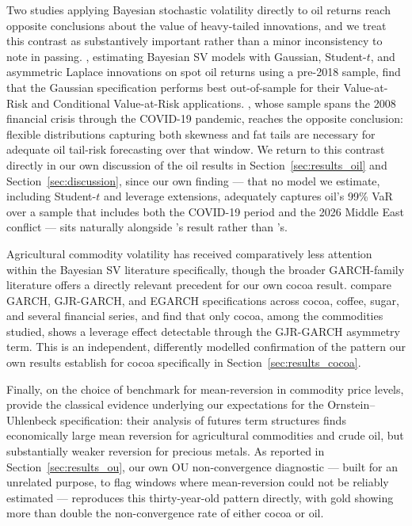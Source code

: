 \documentclass[preprint,12pt,authoryear]{elsarticle}
\begin{document}
Two studies applying Bayesian stochastic volatility directly to oil returns reach opposite conclusions about the value of heavy-tailed innovations, and we treat this contrast as substantively important rather than a minor inconsistency to note in passing. \citet{chenzerillibaum2019}, estimating Bayesian SV models with Gaussian, Student-$t$, and asymmetric Laplace innovations on spot oil returns using a pre-2018 sample, find that the Gaussian specification performs best out-of-sample for their Value-at-Risk and Conditional Value-at-Risk applications. \citet{kuang2022}, whose sample spans the 2008 financial crisis through the COVID-19 pandemic, reaches the opposite conclusion: flexible distributions capturing both skewness and fat tails are necessary for adequate oil tail-risk forecasting over that window. We return to this contrast directly in our own discussion of the oil results in Section~\ref{sec:results_oil} and Section~\ref{sec:discussion}, since our own finding --- that no model we estimate, including Student-$t$ and leverage extensions, adequately captures oil's 99\% VaR over a sample that includes both the COVID-19 period and the 2026 Middle East conflict --- sits naturally alongside \citet{kuang2022}'s result rather than \citet{chenzerillibaum2019}'s.

Agricultural commodity volatility has received comparatively less attention within the Bayesian SV literature specifically, though the broader GARCH-family literature offers a directly relevant precedent for our own cocoa result. \citet{roux2018} compare GARCH, GJR-GARCH, and EGARCH specifications across cocoa, coffee, sugar, and several financial series, and find that only cocoa, among the commodities studied, shows a leverage effect detectable through the GJR-GARCH asymmetry term. This is an independent, differently modelled confirmation of the pattern our own results establish for cocoa specifically in Section~\ref{sec:results_cocoa}.

Finally, on the choice of benchmark for mean-reversion in commodity price levels, \citet{bessembinderetal1995} provide the classical evidence underlying our expectations for the Ornstein--Uhlenbeck specification: their analysis of futures term structures finds economically large mean reversion for agricultural commodities and crude oil, but substantially weaker reversion for precious metals. As reported in Section~\ref{sec:results_ou}, our own OU non-convergence diagnostic --- built for an unrelated purpose, to flag windows where mean-reversion could not be reliably estimated --- reproduces this thirty-year-old pattern directly, with gold showing more than double the non-convergence rate of either cocoa or oil.
\end{document}
